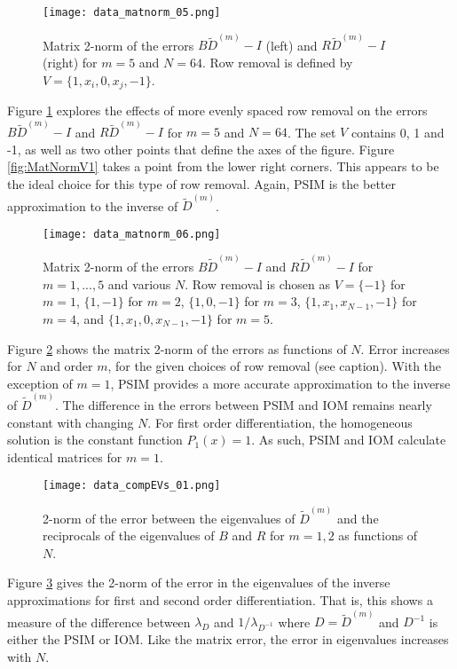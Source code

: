 \documentclass{sfuthesis}
\begin{document}
\begin{figure}
\texttt{[image: data\_matnorm\_05.png]}
\caption{Matrix 2-norm of the errors $B \tilde{D}^{(m)} - I$ (left) and $R \tilde{D}^{(m)} - I$ (right) for $m = 5$ and $N=64$.
Row removal is defined by $V = \{ 1, x_i, 0, x_j, -1 \}$.}
\label{fig:MatNormV3}
\end{figure}

Figure \ref{fig:MatNormV3} explores the effects of more evenly spaced row removal on the errors $B \tilde{D}^{(m)} - I$ and $R \tilde{D}^{(m)} - I$ for $m = 5$ and $N = 64$.
The set $V$ contains 0, 1 and -1, as well as two other points that define the axes of the figure.
Figure \ref{fig:MatNormV1} takes a point from the lower right corners.
This appears to be the ideal choice for this type of row removal.
Again, PSIM is the better approximation to the inverse of $\tilde{D}^{(m)}$.

\begin{figure}
\texttt{[image: data\_matnorm\_06.png]}
\caption{Matrix 2-norm of the errors $B \tilde{D}^{(m)} - I$ and $R \tilde{D}^{(m)} - I$ for $m = 1,...,5$ and various $N$.
Row removal is chosen as $V = \{-1\}$ for $m=1$, $\{1, -1\}$ for $m=2$, $\{1, 0, -1\}$ for $m=3$, $\{1, x_1, x_{N-1}, -1\}$ for $m=4$, and $\{1, x_1, 0, x_{N-1}, -1\}$ for $m=5$.}
\label{fig:MatNormN}
\end{figure}

Figure \ref{fig:MatNormN} shows the matrix 2-norm of the errors as functions of $N$.
Error increases for $N$ and order $m$, for the given choices of row removal (see caption).
With the exception of $m=1$, PSIM provides a more accurate approximation to the inverse of $\tilde{D}^{(m)}$.
The difference in the errors between PSIM and IOM remains nearly constant with changing $N$.
For first order differentiation, the homogeneous solution is the constant function $P_1(x) = 1$.
As such, PSIM and IOM calculate identical matrices for $m=1$.

\begin{figure}
\texttt{[image: data\_compEVs\_01.png]}
\caption{2-norm of the error between the eigenvalues of $\tilde{D}^{(m)}$ and the reciprocals of the eigenvalues of $B$ and $R$ for $m = 1,2$ as functions of $N$.}
\label{fig:compEVs}
\end{figure}

Figure \ref{fig:compEVs} gives the 2-norm of the error in the eigenvalues of the inverse approximations for first and second order differentiation.
That is, this shows a measure of the difference between $\lambda_D$ and $1/\lambda_{D^{-1}}$ where $D = \tilde{D}^{(m)}$ and $D^{-1}$ is either the PSIM or IOM.
Like the matrix error, the error in eigenvalues increases with $N$.
\end{document}
